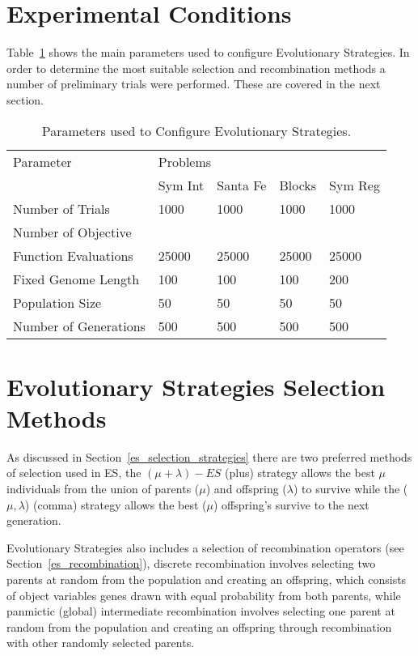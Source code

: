 \section{Experimental Conditions}
Table~\ref{es_param_table} shows the main parameters used to configure Evolutionary Strategies. In order to determine the most suitable selection and recombination methods a number of preliminary trials were performed. These are covered in the next section. 



\begin{table}[h]
\begin{center}
\begin{tabular}{|l|l|l|l|l|}
\hline
Parameter &\multicolumn{4}{l|}{Problems}\\
\cline{2-1} \cline{3-1} \cline{4-1} \cline{5-1} 
 & Sym Int & Santa Fe & Blocks & Sym Reg \\
\hline
Number of Trials & 1000 & 1000 & 1000 & 1000  \\
Number of Objective & & & & \\ 
Function Evaluations  & 25000 & 25000 & 25000 & 25000  \\
Fixed Genome Length  & 100 & 100 & 100 & 200 \\
Population Size  & 50 & 50 & 50 & 50  \\
Number of Generations  & 500 & 500 & 500 & 500  \\
\hline
\end{tabular}
\caption{\label{es_param_table} Parameters used to Configure Evolutionary Strategies.}
\end{center}
\end{table}



\section{Evolutionary Strategies Selection Methods}
As discussed in Section~\ref{es_selection_strategies} there are two preferred methods of selection used in ES, the $(\mu + \lambda)-ES$ (plus) strategy allows the best $\mu$ individuals from the union of parents ($\mu$) and offspring ($\lambda$) to survive while the ($\mu,\lambda$) (comma) strategy allows the best ($\mu$) offspring's survive to the next generation.

Evolutionary Strategies also includes a selection of recombination operators (see Section~\ref{es_recombination}), discrete recombination involves selecting two parents at random from the population and creating an offspring, which consists of object variables genes drawn with equal probability from both parents, while panmictic (global) intermediate recombination involves selecting one parent at random from the population and creating an offspring through recombination with other randomly selected parents.

